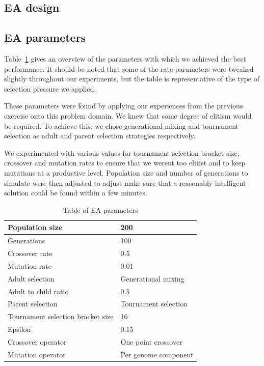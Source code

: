 \documentclass[twoside]{article}
\begin{document}
\begin{multicols}{2} %

  \section{EA design}

  \subsection{EA parameters}

  Table~\ref{tbl:ea-parameters} gives an overview of the parameters with which we achieved the best performance.
  It should be noted that some of the rate parameters were tweaked slightly throughout our experiments, but the table is representative of the type of selection pressure we applied.
  
  These parameters were found by applying our experiences from the previous exercise onto this problem domain.
  We knew that some degree of elitism would be required.
  To achieve this, we chose generational mixing and tournament selection as adult and parent selection strategies respectively.
  
  We experimented with various values for tournament selection bracket size, crossover and mutation rates to ensure that we werent too elitist and to keep mutations at a productive level.
  Population size and number of generations to simulate were then adjusted to adjust make sure that a reasonably intelligent solution could be found within a few minutes.
  
  \begin{table}[H]
    \begin{tabular}{|l|l|}
      \hline
      Population size                   & 200                  \\ \hline
      Generations                       & 100                  \\ \hline
      Crossover rate                    & 0.5                  \\ \hline
      Mutation rate                     & 0.01                 \\ \hline
      Adult selection                   & Generational mixing  \\ \hline
      Adult to child ratio              & 0.5                  \\ \hline
      Parent selection                  & Tournament selection \\ \hline
      Tournament selection bracket size & 16                   \\ \hline
      Epsilon                           & 0.15                 \\ \hline
      Crossover operator                & One point crossover  \\ \hline
      Mutation operator                 & Per genome component \\ \hline
    \end{tabular}
    \caption{Table of EA parameters}
    \label{tbl:ea-parameters}
  \end{table}


\end{multicols}
\end{document}
